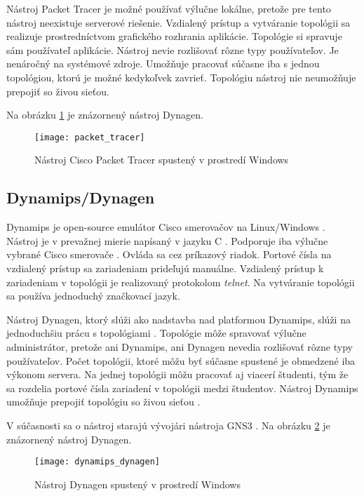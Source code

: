 Nástroj Packet Tracer je možné používať výlučne lokálne, pretože pre tento nástroj neexistuje serverové riešenie. Vzdialený prístup a vytváranie topológii sa realizuje prostredníctvom grafického rozhrania aplikácie. Topológie si spravuje sám používateľ aplikácie. Nástroj nevie rozlišovať rôzne typy používateľov. Je nenáročný na systémové zdroje. Umožňuje pracovať súčasne iba s jednou topológiou, ktorú je možné kedykoľvek zavrieť. Topológiu nástroj nie neumožňuje prepojiť so živou sieťou.

Na obrázku \ref{obr:packet_tracer} je znázornený nástroj Dynagen.

\begin{figure}
    \centering
    \texttt{[image: packet\_tracer]}
    \caption{Nástroj Cisco Packet Tracer spustený v prostredí Windows}
    \cite{obr_packet_tracer}
    \label{obr:packet_tracer}
\end{figure}

\subsection{Dynamips/Dynagen}

Dynamips je open-source emulátor Cisco smerovačov na Linux/Windows \cite{dynamips}. Nástroj je v prevažnej mierie napísaný v jazyku C \cite{dynamips_github}. Podporuje iba výlučne vybrané Cisco smerovače \cite{dynamips}. Ovláda sa cez príkazový riadok. Portové čísla na vzdialený prístup sa zariadeniam prideľujú manuálne. Vzdialený prístup k zariadeniam v topológii je realizovaný protokolom \emph{telnet}. Na vytváranie topológii sa používa jednoduchý značkovací jazyk.

Nástroj Dynagen, ktorý slúži ako nadstavba nad platformou Dynamips, slúži na jednoduchšiu prácu s topológiami \cite{dynamips}. Topológie môže spravovať výlučne administrátor, pretože ani Dynamips, ani Dynagen nevedia rozlišovať rôzne typy používateľov. Počet topológii, ktoré môžu byť súčasne spustené je obmedzené iba výkonom servera. Na jednej topológii môžu pracovať aj viacerí študenti, tým že sa rozdelia portové čísla zariadení v topológii medzi študentov. Nástroj Dynamips umožňuje prepojiť topológiu so živou sieťou \cite{dynamips, dynamips_nil}. 

V súčasnosti sa o nástroj starajú vývojári nástroja GNS3 \cite{dynamips_github}. Na obrázku \ref{obr:dynamips_dynagen} je znázornený nástroj Dynagen.

\begin{figure}
    \centering
    \texttt{[image: dynamips\_dynagen]}
    \caption{Nástroj Dynagen spustený v prostredí Windows} \cite{obr_dynamips_dynagen}
    \label{obr:dynamips_dynagen}
\end{figure}

